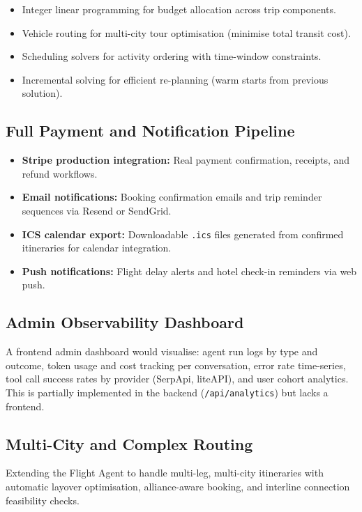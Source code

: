 \documentclass[12pt, a4paper]{article}
\begin{document}
\begin{itemize}[leftmargin=1.5cm, itemsep=0.3em]
  \item Integer linear programming for budget allocation across trip components.
  \item Vehicle routing for multi-city tour optimisation (minimise total transit cost).
  \item Scheduling solvers for activity ordering with time-window constraints.
  \item Incremental solving for efficient re-planning (warm starts from previous solution).
\end{itemize}

\subsection{Full Payment and Notification Pipeline}

\begin{itemize}[leftmargin=1.5cm, itemsep=0.3em]
  \item \textbf{Stripe production integration:} Real payment confirmation, receipts, and refund workflows.
  \item \textbf{Email notifications:} Booking confirmation emails and trip reminder sequences via Resend or SendGrid.
  \item \textbf{ICS calendar export:} Downloadable \texttt{.ics} files generated from confirmed itineraries for calendar integration.
  \item \textbf{Push notifications:} Flight delay alerts and hotel check-in reminders via web push.
\end{itemize}

\subsection{Admin Observability Dashboard}

A frontend admin dashboard would visualise: agent run logs by type and outcome, token usage and cost tracking per conversation, error rate time-series, tool call success rates by provider (SerpApi, liteAPI), and user cohort analytics. This is partially implemented in the backend (\texttt{/api/analytics}) but lacks a frontend.

\subsection{Multi-City and Complex Routing}

Extending the Flight Agent to handle multi-leg, multi-city itineraries with automatic layover optimisation, alliance-aware booking, and interline connection feasibility checks.
\end{document}
